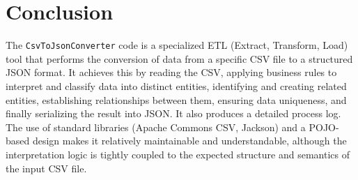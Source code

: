 \documentclass[11pt, a4paper]{article}
\begin{document}
\section{Conclusion}
The \texttt{CsvToJsonConverter} code is a specialized ETL (Extract, Transform, Load) tool that performs the conversion of data from a specific CSV file to a structured JSON format. It achieves this by reading the CSV, applying business rules to interpret and classify data into distinct entities, identifying and creating related entities, establishing relationships between them, ensuring data uniqueness, and finally serializing the result into JSON. It also produces a detailed process log. The use of standard libraries (Apache Commons CSV, Jackson) and a POJO-based design makes it relatively maintainable and understandable, although the interpretation logic is tightly coupled to the expected structure and semantics of the input CSV file.
\end{document}

